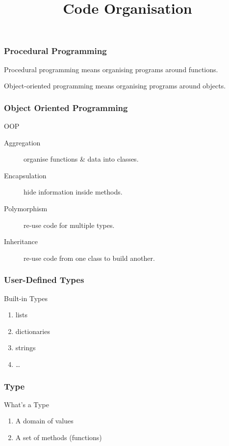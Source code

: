 
\title{Code Organisation}


\frame{\maketitle}

\begin{frame}[fragile]
\frametitle{Procedural Programming}
\alert{Procedural programming} means organising programs around functions.

\alert{Object-oriented programming} means organising programs around objects.
\end{frame}

\begin{frame}[fragile] 
\frametitle{Object Oriented Programming}

\begin{block}{OOP}
\begin{description}
\item[Aggregation] organise functions \& data into classes.
\item[Encapsulation] hide information inside methods.
\item[Polymorphism] re-use code for multiple types.
\item[Inheritance] re-use code from one class to build another.
\end{description}
\end{block}
\end{frame}

\begin{frame}[fragile] 
\frametitle{User-Defined Types}

\begin{block}{Built-in Types}
\begin{enumerate}
\item lists
\item dictionaries
\item strings
\item \ldots
\end{enumerate}
\end{block}
\end{frame}

\begin{frame}[fragile] 
\frametitle{Type}
\begin{block}{What's a Type}
\begin{enumerate}
\item A domain of values
\item A set of methods (functions)
\end{enumerate}
\end{block}

\end{frame}

